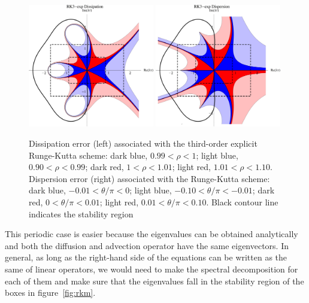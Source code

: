 {\begin{figure}
\includegraphics[clip,width=0.49\textwidth]{figs/RK3_exp_diss.jpg}\hfill
\includegraphics[clip,width=0.49\textwidth]{figs/RK3_exp_disp.jpg}
\caption{Dissipation error (left) associated with the third-order explicit
  Runge-Kutta scheme: dark blue, $0.99<\rho<1$; light blue, $0.90<\rho<0.99$;
  dark red, $1<\rho<1.01$; light red, $1.01<\rho<1.10$. Dispersion error (right)
  associated with the Runge-Kutta scheme: dark blue, $-0.01<\theta/\pi<0$; light
  blue, $-0.10<\theta/\pi<-0.01$; dark red, $0<\theta/\pi<0.01$; light red,
  $0.01<\theta/\pi<0.10$. Black contour line indicates the stability
  region}\label{fig:rkm3}
\end{figure}

This periodic case is easier because the eigenvalues can be obtained
analytically and both the diffusion and advection operator have the same
eigenvectors. In general, as long as the right-hand side of the equations can be
written as the same of linear operators, we would need to make the spectral
decomposition for each of them and make sure that the eigenvalues fall in the
stability region of the boxes in figure~\ref{fig:rkm}.

}
